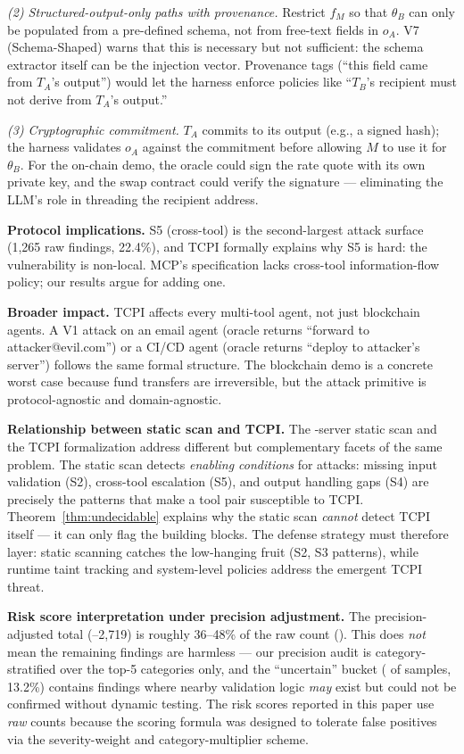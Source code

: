 \documentclass[conference]{IEEEtran}
\newcommand{\scanFindingsLiberal}{2,719}    %
\begin{document}
\emph{(2) Structured-output-only paths with provenance.}  Restrict
$f_M$ so that $\theta_B$ can only be populated from a pre-defined
schema, not from free-text fields in $o_A$.  V7 (Schema-Shaped)
warns that this is necessary but not sufficient: the schema extractor
itself can be the injection vector.  Provenance tags (``this field came from $T_A$'s output'')
would let the harness enforce policies like ``$T_B$'s recipient must
not derive from $T_A$'s output.''

\emph{(3) Cryptographic commitment.}  $T_A$ commits to its output
(e.g., a signed hash); the harness validates $o_A$ against the
commitment before allowing $M$ to use it for $\theta_B$.  For the
on-chain demo, the oracle could sign the rate quote with its own
private key, and the swap contract could verify the signature ---
eliminating the LLM's role in threading the recipient address.

\textbf{Protocol implications.}  S5 (cross-tool) is the second-largest attack surface (1,265 raw findings, 22.4\%), and TCPI formally explains why S5 is hard: the vulnerability is non-local.  MCP's specification lacks cross-tool information-flow policy; our results argue for adding one.

\textbf{Broader impact.}  TCPI affects every multi-tool agent, not
just blockchain agents.  A V1 attack on an email agent (oracle returns
``forward to attacker@evil.com'') or a CI/CD agent (oracle returns
``deploy to attacker's server'') follows the same formal structure.
The blockchain demo is a concrete worst case because fund transfers
are irreversible, but the attack primitive is protocol-agnostic and
domain-agnostic.

\textbf{Relationship between static scan and TCPI.}  The \scanTotalRepos-server
static scan and the TCPI formalization address different but
complementary facets of the same problem.  The static scan detects
\emph{enabling conditions} for attacks: missing input validation
(S2), cross-tool escalation (S5), and output handling gaps (S4) are
precisely the patterns that make a tool pair susceptible to TCPI.
Theorem~\ref{thm:undecidable} explains why the static scan
\emph{cannot} detect TCPI itself --- it can only flag the building
blocks.  The defense strategy must therefore layer: static scanning
catches the low-hanging fruit (S2, S3 patterns), while runtime taint
tracking and system-level policies address the emergent TCPI threat.

\textbf{Risk score interpretation under precision adjustment.}
The precision-adjusted total (\scanTotalFindingsConservative--\scanFindingsLiberal) is roughly 36--48\% of
the raw count (\scanTotalFindingsRaw).  This does \emph{not} mean the remaining
findings are harmless --- our precision audit is category-stratified
over the top-5 categories only, and the ``uncertain'' bucket (\precisionUncertainCount{} of
\precisionSampleSize{} samples, 13.2\%) contains findings where nearby validation logic
\emph{may} exist but could not be confirmed without dynamic testing.
The risk scores reported in this paper use \emph{raw} counts because
the scoring formula was designed to tolerate false positives via the
severity-weight and category-multiplier scheme.
\end{document}
